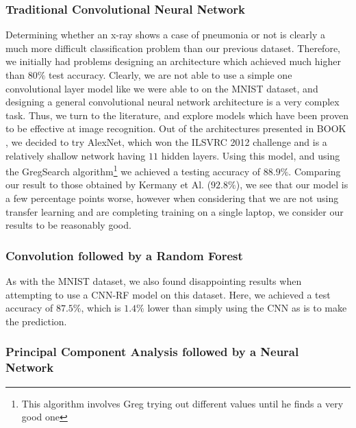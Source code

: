 \documentclass[onecolumn,10pt,cleanfoot]{asme2ej}
\begin{document}
\subsubsection{Traditional Convolutional Neural Network}

Determining whether an x-ray shows a case of pneumonia or not is clearly a much more difficult classification problem than our previous dataset. Therefore, we initially had problems designing an architecture which achieved much higher than $80\%$ test accuracy. Clearly, we are not able to use a simple one convolutional layer model like we were able to on the MNIST dataset, and designing a general convolutional neural network architecture is a very complex task. Thus, we turn to the literature, and explore models which have been proven to be effective at image recognition. Out of the architectures presented in BOOK \cite{geron}, we decided to try AlexNet, which won the ILSVRC 2012 challenge and is a relatively shallow network having $11$ hidden layers. Using this model, and using the GregSearch algorithm\footnote{This algorithm involves Greg trying out different values until he finds a very good one} we achieved a testing accuracy of $88.9\%$. Comparing our result to those obtained by Kermany et Al. ($92.8\%$), we see that our model is a few percentage points worse, however when considering that we are not using transfer learning and are completing training on a single laptop, we consider our results to be reasonably good.

\subsubsection{Convolution followed by a Random Forest}

As with the MNIST dataset, we also found disappointing results when attempting to use a CNN-RF model on this dataset. Here, we achieved a test accuracy of $87.5\%$, which is $1.4\%$ lower than simply using the CNN as is to make the prediction. 

\subsubsection{Principal Component Analysis followed by a Neural Network}
\end{document}
